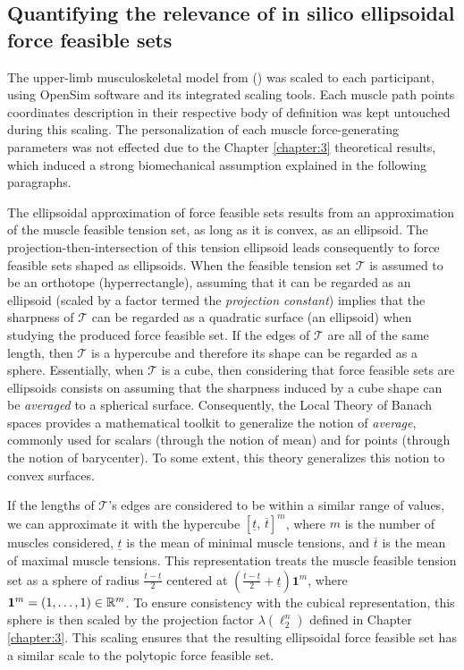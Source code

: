 \clearpage
\subsection{Quantifying the relevance of in silico ellipsoidal force feasible sets}
The upper-limb musculoskeletal model from (\cite{holzbaurModelUpperExtremity2005}) was scaled to each participant, using OpenSim software and its integrated scaling tools. Each muscle path points coordinates description in their respective body of definition was kept untouched during this scaling. The personalization of each muscle force-generating parameters was not effected due to the Chapter \ref{chapter:3} theoretical results, which induced a strong biomechanical assumption explained in the following paragraphs.

The ellipsoidal approximation of force feasible sets results from an approximation of the muscle feasible tension set, as long as it is convex, as an ellipsoid. The projection-then-intersection of this tension ellipsoid leads consequently to force feasible sets shaped as ellipsoids. When the feasible tension set $\mathcal{T}$ is assumed to be an orthotope (hyperrectangle), assuming that it can be regarded as an ellipsoid (scaled by a factor termed the \emph{projection constant}) implies that the sharpness of $\mathcal{T}$ can be regarded as a quadratic surface (an ellipsoid) when studying the produced force feasible set. If the edges of $\mathcal{T}$ are all of the same length, then $\mathcal{T}$ is a hypercube and therefore its shape can be regarded as a sphere. Essentially, when $\mathcal{T}$ is a cube, then considering that force feasible sets are ellipsoids consists on assuming that the sharpness induced by a cube shape can be \emph{averaged} to a spherical surface. Consequently, the Local Theory of Banach spaces provides a mathematical toolkit to generalize the notion of \emph{average}, commonly used for scalars (through the notion of mean) and for points (through the notion of barycenter). To some extent, this theory generalizes this notion to convex surfaces.

If the lengths of $\mathcal{T}$'s edges are considered to be within a similar range of values, we can approximate it with the hypercube $[\underline{t},\, \overline{t}]^m$, where $m$ is the number of muscles considered, $\underline{t}$ is the mean of minimal muscle tensions, and $\overline{t}$ is the mean of maximal muscle tensions. This representation treats the muscle feasible tension set as a sphere of radius $\frac{\overline{t} - \underline{t}}{2}$ centered at $\left(\frac{\overline{t} - \underline{t}}{2} + \underline{t}\right)\mathbf{1}^m$, where $\mathbf{1}^m=(1,\dots, 1)\in \mathbb{R}^m$. To ensure consistency with the cubical representation, this sphere is then scaled by the projection factor $\lambda(\ell_2^n)$ defined in Chapter \ref{chapter:3}. This scaling ensures that the resulting ellipsoidal force feasible set has a similar scale to the polytopic force feasible set.


